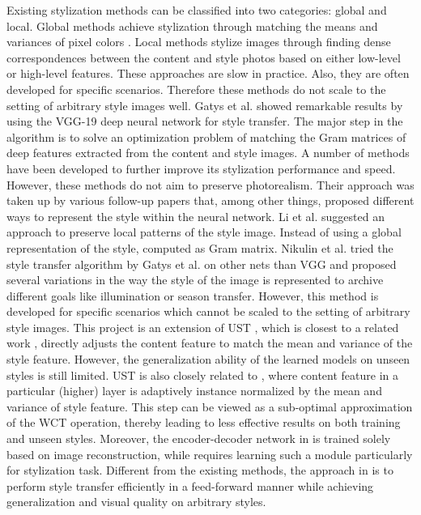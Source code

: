 \hspace{0.5cm} Existing stylization methods can be classified into two categories: global and local. Global methods \cite{bib12, bib13} achieve stylization through matching the means and variances of pixel colors \cite{bib12}. Local methods \cite{bib14} stylize images through finding dense correspondences between the content and style photos based on either low-level or high-level features. These approaches are slow in practice. Also, they are often developed for specific scenarios. Therefore these methods do not scale to the setting of arbitrary style images well. Gatys et al. \cite{bib7, bib8} showed remarkable results by using the VGG-19 deep neural network for style transfer. The major step in the algorithm is to solve an optimization problem of matching the Gram matrices of deep features extracted from the content and style images. A number of methods have been developed \cite{bib15, bib16, bib17} to further improve its stylization performance and speed. However, these methods do not aim to preserve photorealism. Their approach was taken up by various follow-up papers that, among other things, proposed different  ways  to  represent  the  style  within  the  neural  network. Li et al. \cite{bib15} suggested an approach to preserve local patterns of the style image. Instead of using a global representation of the style, computed as Gram matrix. Nikulin et al. \cite{bib18} tried the style transfer algorithm by Gatys et al. on other nets than VGG and proposed several variations in the way the style of the image is represented  to archive different goals like illumination or season transfer. However, this method is developed for specific scenarios which cannot be scaled to the setting of arbitrary style images. This project is an extension of UST \cite{bib11}, which is closest to a related work \cite{bib19}, directly adjusts the content feature to match the mean and variance of the style feature. However, the generalization ability of the learned models on unseen styles is still limited. UST is also closely related to \cite{bib15}, where content feature in a particular (higher) layer is adaptively instance normalized by the mean and variance of style feature. This step can be viewed as a sub-optimal approximation of the WCT operation, thereby leading to less effective results on both training and unseen styles. Moreover, the  encoder-decoder network in \cite{bib11} is trained solely based on image reconstruction, while \cite{bib15} requires learning such a module particularly for stylization task. Different from the existing methods, the approach in \cite{bib11} is to perform style transfer efficiently in a feed-forward manner while achieving generalization and visual quality on arbitrary styles. 